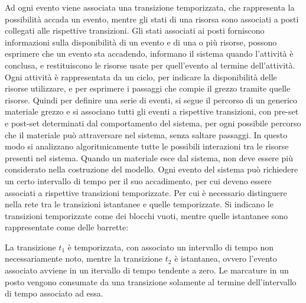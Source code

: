 \documentclass{article}
\numberwithin{equation}{subsection}
\begin{document}
Ad ogni evento viene associata una transizione temporizzata, che rappresenta la possibilità accada un evento, mentre gli stati di una risorsa sono associati a posti collegati 
alle rispettive transizioni. Gli stati 
associati ai posti forniscono informazioni sulla disponibilità di un evento e di una o più risorse, possono esprimere che un evento sta accadendo, informano il sistema 
quando l'attività è conclusa, e restituiscono le risorse usate per quell'evento al termine dell'attività. Ogni attività è rappresentata da un ciclo, per indicare la 
disponibilità delle risorse utilizzare, e per esprimere i passaggi che compie il grezzo tramite quelle risorse. Quindi per definire una serie di eventi, si segue il 
percorso di un generico materiale grezzo e si associano tutti gli eventi a rispettive transizioni, con pre-set e post-set determinati dal comportamento del sistema, per ogni 
possibile percorso che il materiale può attraversare nel sistema, senza saltare passaggi. In questo modo si analizzano algoritmicamente tutte le possibili interazioni tra le 
risorse presenti nel sistema. Quando un materiale esce dal sistema, non deve essere più considerato nella costruzione del modello. Ogni evento del sistema può richiedere 
un certo intervallo di tempo per il suo accadimento, per cui deveno essere associati a rispettive transizioni temporizzate. Per cui è necessario distinguere nella rete tra le 
transizioni istantanee e quelle temporizzate. Si indicano le transizioni temporizzate come dei blocchi vuoti, mentre quelle istantanee sono rappresentate come delle barrette:
\begin{center}
\end{center}
La transizione $t_1$ è temporizzata, con associato un intervallo di tempo non necessariamente noto, mentre la transizione $t_2$ è istantanea, ovvero l'evento associato avviene in un itervallo di 
tempo tendente a zero. 
Le marcature in un posto vengono consumate da una transizione solamente al termine dell'intervallo di tempo associato ad essa. 
\end{document}
